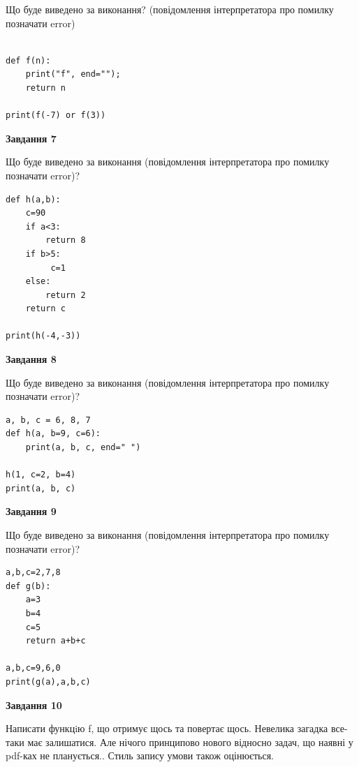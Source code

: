 \documentclass[12pt, ukrainian]{article}
\begin{document}
{\begin {large}
Що буде виведено за виконання? (повідомлення інтерпретатора про помилку позначати error)\par
\begin{verbatim}

def f(n):
    print("f", end="");
    return n

print(f(-7) or f(3))
\end{verbatim}

{\begin {center}\textbf{Завдання 7}\end {center}}

Що буде виведено за виконання (повідомлення інтерпретатора про помилку позначати error)?\par
\begin{verbatim}
def h(a,b):
    c=90
    if a<3:
        return 8
    if b>5:
         c=1
    else: 
        return 2
    return c

print(h(-4,-3))
\end{verbatim}

{\begin {center}\textbf{Завдання 8}\end {center}}

Що буде виведено за виконання (повідомлення інтерпретатора про помилку позначати error)?\par
\begin{verbatim}
a, b, c = 6, 8, 7
def h(a, b=9, c=6):
    print(a, b, c, end=" ")

h(1, c=2, b=4)
print(a, b, c)
\end{verbatim}

{\begin {center}\textbf{Завдання 9}\end {center}}

Що буде виведено за виконання (повідомлення інтерпретатора про помилку позначати error)?\par
\begin{verbatim}
a,b,c=2,7,8
def g(b):
    a=3
    b=4
    c=5
    return a+b+c

a,b,c=9,6,0
print(g(a),a,b,c)
\end{verbatim}

{\begin {center}\textbf{Завдання 10}\end {center}}


Написати функцiю f, що отримує щось та повертає щось. Невелика загадка все-таки має залишатися. Але нічого принципово нового відносно задач, що наявні у pdf-ках не планується.. Стиль запису умови також оцінюється.\par
\end {large}}
\newpage
\end{document}
